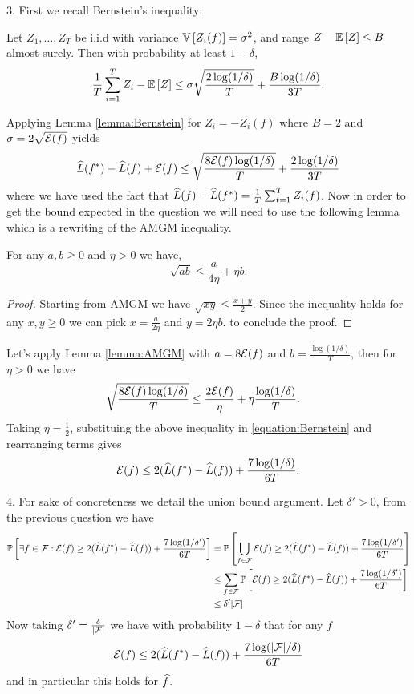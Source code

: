 \begin{solution}[]
3. First we recall Bernstein's inequality:
\begin{lemma}
    \label{lemma:Bernstein}
    Let $Z_1,\ldots,Z_T$ be i.i.d with variance $\mathbb{V}\left[Z_i(f)\right]=\sigma^2$, and range $Z-\mathbb{E}\left[Z\right]\leq B$ almost surely.
    Then with probability at least $1-\delta$,
    \[ \frac{1}{T}\sum_{i=1}^{T}Z_i -\mathbb{E}\left[Z\right]\leq \sigma\sqrt{\frac{2\log(1/\delta)}{T}}+\frac{B\log(1/\delta)}{3T}.\]
\end{lemma}
Applying Lemma \ref{lemma:Bernstein} for $Z_i=-Z_i(f)$ where $B= 2$ and $\sigma = 2\sqrt{\mathcal{E}(f)}$ yields    
\begin{equation}
    \label{equation:Bernstein}
    \widehat L(f^*)- \widehat L(f) + \mathcal{E}(f) \leq \sqrt{\frac{8\mathcal{E}(f)\log(1/\delta)}{T}}+\frac{2\log(1/\delta)}{3T}
\end{equation}
where we have used the fact that $\widehat L(f)-\widehat L(f^*) = \frac{1}{T}\sum_{t=1}^{T}Z_i(f)$.
Now in order to get the bound expected in the question we will need to use the following lemma which is a rewriting of the AMGM inequality.
\begin{lemma}
    \label{lemma:AMGM}
  For any $a,b\geq 0$ and $\eta >0$ we have,
  \[ \sqrt{ab} \leq \frac{a}{4\eta} +\eta b.\] 
\end{lemma}
\begin{proof}
    Starting from AMGM we have $\sqrt{xy} \leq \frac{x+y}{2}$.
    Since the inequality holds for any $x,y \geq 0$ we can pick $x = \frac{a}{2\eta}$ and $y=2\eta b$.
    to conclude the proof.
\end{proof}
Let's apply Lemma \ref{lemma:AMGM} with $a=8\mathcal{E}(f)$ and $b=\frac{\log(1/\delta)}{T}$, then for $\eta>0$ we have
\begin{align*}
    \sqrt{\frac{8\mathcal{E}(f)\log(1/\delta)}{T}}&\leq \frac{2\mathcal{E}(f)}{\eta} + \eta \frac{\log(1/\delta)}{T}.
\end{align*}
Taking $\eta=\frac{1}{2}$, substituing the above inequality in \ref{equation:Bernstein} and rearranging terms gives
\[ \mathcal{E}(f) \leq 2( \widehat L(f^*)- \widehat L(f))+\frac{7\log(1/\delta)}{6T}.\]

4. For sake of concreteness we detail the union bound argument. Let $\delta' >0$, from the previous question we have
\begin{align*}
\mathbb{P}\left[\exists f \in \mathcal{F}:\mathcal{E}(f)\geq 2( \widehat L(f^*)- \widehat L(f))+\frac{7\log(1/\delta')}{6T}\right]&=   \mathbb{P}\left[\bigcup_{f\in\mathcal{F}}\mathcal{E}(f) \geq 2( \widehat L(f^*)- \widehat L(f))+\frac{7\log(1/\delta')}{6T}\right]\\
&\leq \sum_{f\in\mathcal{F}}  \mathbb{P}\left[\mathcal{E}(f) \geq 2( \widehat L(f^*)- \widehat L(f))+\frac{7\log(1/\delta')}{6T}\right]\\
&\leq \delta' |\mathcal{F}|
\end{align*} 
 Now taking $\delta'=\frac{\delta}{|\mathcal{F}|}$ we have with probability $1-\delta$ that for any $f$
 \[ \mathcal{E}(f) \leq 2( \widehat L(f^*)- \widehat L(f))+\frac{7\log(|\mathcal{F}|/\delta)}{6T}\]
 and in particular this holds for $\widehat f$.
\end{solution}
